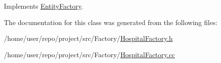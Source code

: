 Implements \hyperlink{classEntityFactory_a7f579ca02f15935e6901e5c955c9726a}{Entity\+Factory}.



The documentation for this class was generated from the following files\+:\begin{DoxyCompactItemize}
\item 
/home/user/repo/project/src/\+Factory/\hyperlink{HospitalFactory_8h}{Hospital\+Factory.\+h}\item 
/home/user/repo/project/src/\+Factory/\hyperlink{HospitalFactory_8cc}{Hospital\+Factory.\+cc}\end{DoxyCompactItemize}

